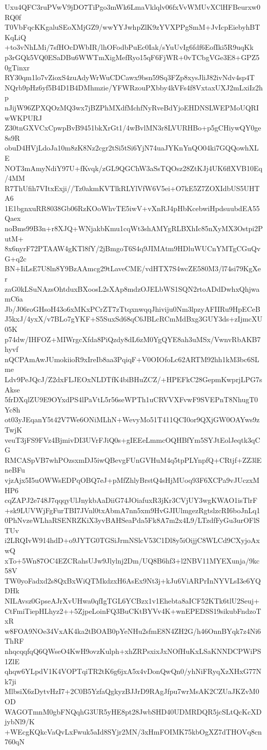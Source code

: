 Uxu4QFC3ruPVwV9jDO7TiPgo3mWk6LmaVklqlv06fxVvWMUvXClHFBeurxw0RQ0f
T0VbFqcKKgaluSEoXMjGZ9/wwYYJwhpZlK9zYVXPPgSmM+JvIcpEiebyhBTKqLiQ
+to3vNhLMi/7sfHOcDWbIR/lhOFodbPuEc0Iak/sYuUvIg6fdf6EofIki5R9uqKk
p3rGQk5VQ0ESaDBu6WWTmXigMefRyo15qF6FjWR+0vTCbgVGe3E8+GPZ50gTinxr
RY30qm1lo7vZioxS4zuAdyWrWuCDCawx9bsn59Sq3FZp8xysJliJ82ivNdv4sp4T
NQrb9pHz6yf5B4D1B4DMhmzie/YFWRzouPXbby4kVFs4f8VxtaxUXJ2mLxiIz2hp
nJijW96ZPXQOzMQ3wx7jBZPhMXdfMchfNyRveBdYjoEHDNSLWEPMoUQRIwWKPURJ
Z30tnGXVCxCpwpBvB9451bkXrGt1/4wBvlMN3r8LVURHBo+p5gCHiywQY0ge8s9R
obuD4HVjLdoJa10m8zK8Nz2cgr2tSi5tSi6YjN74uaJYKnYnQO04ki7GQQowhXLE
NOT3mAmyNdiY97U+fKvqk/zGL9QGChW3aSsTQOsz28ZtKJj4UK6flXVB10Eq/4MM
R7ThUfih7VItxExji//Tz0akmKVTlkRLYlVfW6V5ei+O7kE5Z7ZOXIdbUS5UHTA6
1E1bgnxuRR8038Gb06RzKOoWhvTE5iwV+vXnRJ4pHbKcebwiHpdsuubdEA55Qaex
noBms99B3n+r8XJQ+WNjakbKmu1cqWt3shAMYgRLBXhIc85nXyMX3Ostpi2PutM+
8x6nyrF72PTAAW4gKTl8fY/2jBmgoT6S4q9JIMAtm9HDluWUCnYMTgCGuQvG+q2c
BN+IiLsE7U8ln8Y9BzAAmcg29tLaveCME/vdHTX7S4wcZE580M3/l74si79KgXer
zaG0kLSuNAzsOhtduxBXoosL2sXAp8mdzOJELbWS1SQN2rtoADdDwhxQhjwamC6a
Jb/J06roGHsoH43o6xMKxPCrZT7zTtqxnwqqJhiviju0Nm3lpzyAFIIRu9HpECeB
J5kxJ/4yxX/v7BLo7gYKF+S5SuxSd68qC6JBLcRCmMdBxg3GUY3ds+zIjmcXU05K
p74dw/IHFOZ+MIWrgcXfda8PiQzdy8dL6zM0YgQYE8ah3uMSx/VwnvRbAKB7hyvf
nQCPAmAwJUmokiioR9xIreIb8aa3PqiqF+V0OIOfoLc62ARTM92hh1kM3bc6SLme
Ldv9PeJQcJ/Z2dxFLJEOxNLDTfK4biBHuZCZ/+HPEFkC28GepmKwprjLPG7sAkse
5frDXqlZU9E9OYxdPS4lPaVtL5r56seWPTh1uCRVVXFvwF9SVEPnT8NhugT0Yc8h
ot03yJEqanY5t42V7We6ONiMLhN+WevyMo51T411QCI0or9QXjGW0OAYws9zTwjK
veuT3jFS9FVz4BjmivDI3UVrFJiQ0s+gIEEeLmmcOQHBfYm5SYJtEolJeqtk3qCG
RMCASpVB7whPOzsxmDJ5iwQBevgFUnGVHuM4q5tpPLYnpfQ+CRtjf+ZZ3lEneBFu
vjzAjx5I5uOWWsEDPqOBQ7eJ+pMfZhlyBrstQ4sHjMUoq93F6XCPa9vJUczxMHP6
cqZAPJ2e748J7qqqyUlJnykbAaDiiG74JOiafuxR3jKr3CVjUY3wgKWAO1isTlrF
+sk9LUVWjFgFurTBI7JVnl0txAbmA7nn5xm9HvGJIUlmgezRgtslzcRI6boJnLq1
0PhNvzeWLhaRSENRZKiX3yvBAHSeaPda5Fk8A7m2x4L9/LTzdfFyGu3urOFlSTUv
i2LRQIvW914hdD+o9JYTG0TGSiJrmNSlcV53C1Dl8y5iOijjC8WLCd9CXyjoAxwQ
xTo+5Wn87OC4EZCRahsUJw9Jlylnj2Dm/UQ8B6hf3+l2NBV11MYEXunja/9kc58V
TW0yoFadxd2s8QxBxWiQTMkdzxH6AsEx9Nt3j+kJu6ViARPrInNYVLsI3e6YQDHk
NILAvsz0GpseAJrXvUHwa0qfIgTGL6YCBzx1v1Ehebta8aICF52KTk6tlU2Seuj+
CtFmiTiepHLhyz2++5ZjpeLoinFQ3BuCKtBYVv4K+wnEPEDSS19sikubFndzoTxR
w8FOA9NOe34VxAK4ka2tBOAB0pYeNHu2sfmE8N4ZH2G/h46OnnBYqk7z4Ni6ThRF
nhqcqqfqQ6QWseO4KwH9ovzKulph+xhZRPsxixJxNOfHuKxLSaKNNDCPWiPS1ZlE
qhqw6YLpdV1K4VOPTqiTR2tK6g6jxA5x4vDonQwQn0/yhNiFRyqXzXHxG77Nk7ji
MlbsiX6zDytvHzI7+2C0B5YzfaQgkyzBJJrD9RAgJfpu7wrMsAK2CZUaJKZvM0OD
WAGOTmnM0gbFNQqhG3UR5yHE8pt28JwbSHD40UDMRDQR5jcSLtQcKcXDjybNl9/K
+WEcgKQkcVaQvLxFwuk5aId8SYjr2MN/3xHmFOIMK75kbOgXZ7dTHOVq8cn760qN
